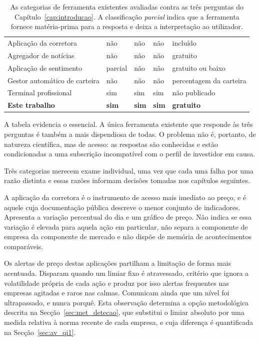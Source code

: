 \begin{table}[!htbp]
\caption[As ferramentas existentes contra as três perguntas]{As categorias de ferramenta existentes
avaliadas contra as três perguntas do Capítulo~\ref{cap:introducao}. A classificação
\emph{parcial} indica que a ferramenta fornece matéria-prima para a resposta e deixa a
interpretação ao utilizador.}
\label{tab:ctx_ferramentas}
\centering
\small
\begin{tabular}{L{0.22\textwidth} C{0.11\textwidth} C{0.15\textwidth} C{0.12\textwidth}
                L{0.17\textwidth}}
\toprule
{} &  &  &
 &  \\
\midrule
Aplicação da corretora & não & não & não & incluído \\
Agregador de notícias & não & não & não & gratuito \\
Aplicação de sentimento & parcial & não & não & gratuito ou baixo \\
Gestor automático de carteira & não & não & não & percentagem da carteira \\
Terminal profissional & sim & sim & sim & não publicado \\
\midrule
\textbf{Este trabalho} & \textbf{sim} & \textbf{sim} & \textbf{sim} & \textbf{gratuito} \\
\bottomrule
\end{tabular}
\end{table}

A tabela evidencia o essencial. A única ferramenta existente que responde às três perguntas é
também a mais dispendiosa de todas. O problema não é, portanto, de natureza científica, mas de acesso: as respostas são
conhecidas e estão condicionadas a uma subscrição incompatível com o perfil de investidor em causa.

Três categorias merecem exame individual, uma vez que cada uma falha por uma razão distinta e essas
razões informam decisões tomadas nos capítulos seguintes.

A aplicação da corretora é o instrumento de acesso mais imediato ao preço, e é aquele cuja
documentação pública descreve o menor conjunto de indicadores. Apresenta a variação percentual do
dia e um gráfico de preço. Não indica se essa variação é elevada
para aquela ação em particular, não separa a componente de empresa da componente de mercado e não
dispõe de memória de acontecimentos comparáveis.

Os alertas de preço destas aplicações partilham a limitação de forma mais acentuada. Disparam
quando um limiar fixo é atravessado, critério que ignora a volatilidade própria de cada ação e
produz por isso alertas frequentes nas empresas agitadas e raros nas calmas. Comunicam ainda que um nível foi
ultrapassado, e nunca porquê. Esta observação determina a opção metodológica descrita na
Secção~\ref{sec:met_detecao}, que substitui o limiar absoluto por uma medida relativa à norma
recente de cada empresa, e cuja diferença é quantificada na Secção~\ref{sec:av_qi1}.


